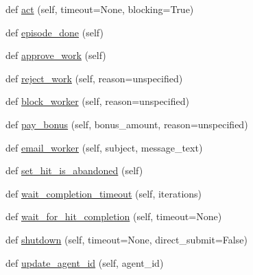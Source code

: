 \begin{DoxyCompactItemize}
\item 
def \hyperlink{classparlai_1_1mturk_1_1core_1_1legacy__2018_1_1agents_1_1MTurkAgent_a8213027b870c39332a5431dbcd6c69b9}{act} (self, timeout=None, blocking=True)
\item 
def \hyperlink{classparlai_1_1mturk_1_1core_1_1legacy__2018_1_1agents_1_1MTurkAgent_ab989adcb9b0f2c2cdb3ec43445ea660c}{episode\+\_\+done} (self)
\item 
def \hyperlink{classparlai_1_1mturk_1_1core_1_1legacy__2018_1_1agents_1_1MTurkAgent_a814894377ea555da46004a6459e30418}{approve\+\_\+work} (self)
\item 
def \hyperlink{classparlai_1_1mturk_1_1core_1_1legacy__2018_1_1agents_1_1MTurkAgent_a9343b55ce980daa021253197a1852668}{reject\+\_\+work} (self, reason=\textquotesingle{}unspecified\textquotesingle{})
\item 
def \hyperlink{classparlai_1_1mturk_1_1core_1_1legacy__2018_1_1agents_1_1MTurkAgent_a50e51af01741ae9de7178971e9dc9f0e}{block\+\_\+worker} (self, reason=\textquotesingle{}unspecified\textquotesingle{})
\item 
def \hyperlink{classparlai_1_1mturk_1_1core_1_1legacy__2018_1_1agents_1_1MTurkAgent_ad5cc68dcd472181264b97cae8bb0f63e}{pay\+\_\+bonus} (self, bonus\+\_\+amount, reason=\textquotesingle{}unspecified\textquotesingle{})
\item 
def \hyperlink{classparlai_1_1mturk_1_1core_1_1legacy__2018_1_1agents_1_1MTurkAgent_ae0ae59f99630aeebb0ef2123711948b3}{email\+\_\+worker} (self, subject, message\+\_\+text)
\item 
def \hyperlink{classparlai_1_1mturk_1_1core_1_1legacy__2018_1_1agents_1_1MTurkAgent_a748e50850e239f14236d4817e20fa799}{set\+\_\+hit\+\_\+is\+\_\+abandoned} (self)
\item 
def \hyperlink{classparlai_1_1mturk_1_1core_1_1legacy__2018_1_1agents_1_1MTurkAgent_af12ef4e56cea2b9800123c43227513d8}{wait\+\_\+completion\+\_\+timeout} (self, iterations)
\item 
def \hyperlink{classparlai_1_1mturk_1_1core_1_1legacy__2018_1_1agents_1_1MTurkAgent_a89e1e1c284db9228d61afb3f93247b12}{wait\+\_\+for\+\_\+hit\+\_\+completion} (self, timeout=None)
\item 
def \hyperlink{classparlai_1_1mturk_1_1core_1_1legacy__2018_1_1agents_1_1MTurkAgent_a13d1446c41c7342e3d23719cf190d304}{shutdown} (self, timeout=None, direct\+\_\+submit=False)
\item 
def \hyperlink{classparlai_1_1mturk_1_1core_1_1legacy__2018_1_1agents_1_1MTurkAgent_a72ce27a25ace6cceda8d01bf6bf9f294}{update\+\_\+agent\+\_\+id} (self, agent\+\_\+id)
\end{DoxyCompactItemize}
